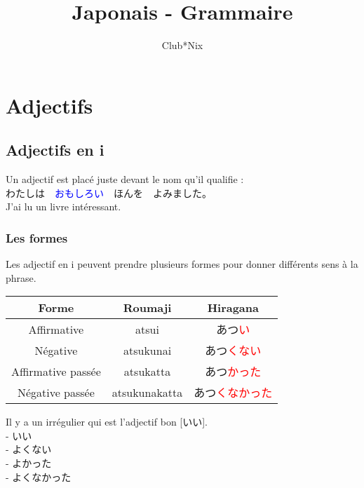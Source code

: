 \documentclass[11pt]{report}
\title{Japonais - Grammaire}
\author{
	Club*Nix
}
\newenvironment{Japanese}{%
\CJKfamily{min}%
\CJKtilde  
\CJKnospace}{}
\begin{document}
\maketitle
\tableofcontents

\chapter{Adjectifs}

\section{Adjectifs en i}

\begin{CJK}{UTF8}{}  
\begin{Japanese}
	\begin{flushleft}
	Un adjectif est plac\'e juste devant le nom qu'il qualifie : \\
	わたしは　\textcolor{blue}{おもしろい}　ほんを　よみました。 \\
	J'ai lu un livre intéressant.
	\end{flushleft}
\end{Japanese}  
\end{CJK}

\subsection{Les formes}

\begin{CJK}{UTF8}{}  
\begin{Japanese}
Les adjectif en i peuvent prendre plusieurs formes pour donner différents sens \`a la phrase.
	\begin{center}
		\begin{tabular}{|c|c|c|}
			\hline
			\textbf{Forme} & \textbf{Roumaji} & \textbf{Hiragana} \\
			\hline
			Affirmative & atsui & あつ\textcolor{red}{い} \\
			\hline
			Négative & atsukunai & あつ\textcolor{red}{くない} \\
			\hline
			Affirmative passée & atsukatta & あつ\textcolor{red}{かった} \\
			\hline
			Négative passée & atsukunakatta & あつ\textcolor{red}{くなかった} \\
			\hline 
		\end{tabular}
	\end{center}
	Il y a un irrégulier qui est l'adjectif bon [いい]. \\
	- いい \\
	- よくない \\
	- よかった \\
	- よくなかった
\end{Japanese}  
\end{CJK}
\end{document}
